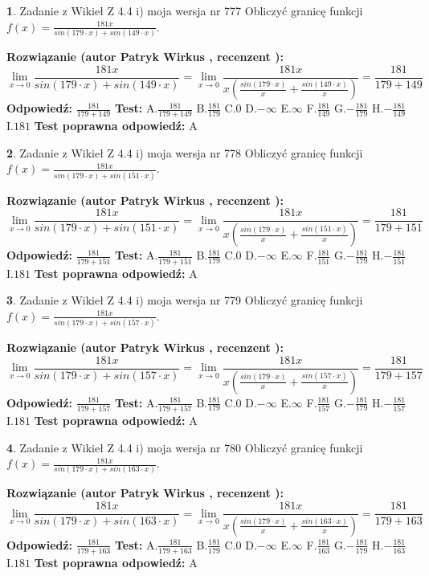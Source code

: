 \documentclass[12pt, a4paper]{article}
\theoremstyle{definition} %
\newtheorem{zad}{}
\newcommand{\zadStart}[1]{\begin{zad}#1\newline}
\newcommand{\zadStop}{\end{zad}}
\newcommand{\rozwStart}[2]{\noindent \textbf{Rozwiązanie (autor #1 , recenzent #2): }\newline}
\newcommand{\rozwStop}{\newline}
\newcommand{\odpStart}{\noindent \textbf{Odpowiedź:}\newline}
\newcommand{\odpStop}{\newline}
\newcommand{\testStart}{\noindent \textbf{Test:}\newline}
\newcommand{\testStop}{\newline}
\newcommand{\kluczStart}{\noindent \textbf{Test poprawna odpowiedź:}\newline}
\newcommand{\kluczStop}{\newline}
\begin{document}
\zadStart{Zadanie z Wikieł Z 4.4 i) moja wersja nr 777}
Obliczyć granicę funkcji $f(x)=\frac{181x}{sin(179\cdot x) +sin(149\cdot x)}$.
\zadStop
\rozwStart{Patryk Wirkus}{}
$$\lim\limits_{x\to 0}\frac{181x}{sin(179\cdot x) +sin(149\cdot x)}=\lim\limits_{x\to 0}\frac{181x}{x(\frac{sin(179\cdot x)}{x}+\frac{sin(149\cdot x)}{x})}=\frac{181}{179+149}$$
\rozwStop
\odpStart
$\frac{181}{179+149}$
\odpStop
\testStart
A.$\frac{181}{179+149}$
B.$\frac{181}{179}$
C.$0$
D.$-\infty$
E.$\infty$
F.$\frac{181}{149}$
G.$-\frac{181}{179}$
H.$-\frac{181}{149}$
I.$181$
\testStop
\kluczStart
A
\kluczStop



\zadStart{Zadanie z Wikieł Z 4.4 i) moja wersja nr 778}
Obliczyć granicę funkcji $f(x)=\frac{181x}{sin(179\cdot x) +sin(151\cdot x)}$.
\zadStop
\rozwStart{Patryk Wirkus}{}
$$\lim\limits_{x\to 0}\frac{181x}{sin(179\cdot x) +sin(151\cdot x)}=\lim\limits_{x\to 0}\frac{181x}{x(\frac{sin(179\cdot x)}{x}+\frac{sin(151\cdot x)}{x})}=\frac{181}{179+151}$$
\rozwStop
\odpStart
$\frac{181}{179+151}$
\odpStop
\testStart
A.$\frac{181}{179+151}$
B.$\frac{181}{179}$
C.$0$
D.$-\infty$
E.$\infty$
F.$\frac{181}{151}$
G.$-\frac{181}{179}$
H.$-\frac{181}{151}$
I.$181$
\testStop
\kluczStart
A
\kluczStop



\zadStart{Zadanie z Wikieł Z 4.4 i) moja wersja nr 779}
Obliczyć granicę funkcji $f(x)=\frac{181x}{sin(179\cdot x) +sin(157\cdot x)}$.
\zadStop
\rozwStart{Patryk Wirkus}{}
$$\lim\limits_{x\to 0}\frac{181x}{sin(179\cdot x) +sin(157\cdot x)}=\lim\limits_{x\to 0}\frac{181x}{x(\frac{sin(179\cdot x)}{x}+\frac{sin(157\cdot x)}{x})}=\frac{181}{179+157}$$
\rozwStop
\odpStart
$\frac{181}{179+157}$
\odpStop
\testStart
A.$\frac{181}{179+157}$
B.$\frac{181}{179}$
C.$0$
D.$-\infty$
E.$\infty$
F.$\frac{181}{157}$
G.$-\frac{181}{179}$
H.$-\frac{181}{157}$
I.$181$
\testStop
\kluczStart
A
\kluczStop



\zadStart{Zadanie z Wikieł Z 4.4 i) moja wersja nr 780}
Obliczyć granicę funkcji $f(x)=\frac{181x}{sin(179\cdot x) +sin(163\cdot x)}$.
\zadStop
\rozwStart{Patryk Wirkus}{}
$$\lim\limits_{x\to 0}\frac{181x}{sin(179\cdot x) +sin(163\cdot x)}=\lim\limits_{x\to 0}\frac{181x}{x(\frac{sin(179\cdot x)}{x}+\frac{sin(163\cdot x)}{x})}=\frac{181}{179+163}$$
\rozwStop
\odpStart
$\frac{181}{179+163}$
\odpStop
\testStart
A.$\frac{181}{179+163}$
B.$\frac{181}{179}$
C.$0$
D.$-\infty$
E.$\infty$
F.$\frac{181}{163}$
G.$-\frac{181}{179}$
H.$-\frac{181}{163}$
I.$181$
\testStop
\kluczStart
A
\kluczStop
\end{document}
